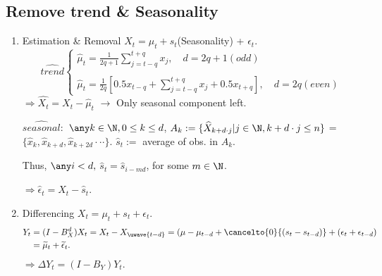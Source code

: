 \subsection{Remove trend \& Seasonality}
\begin{enumerate}
    \item Estimation \& Removal $X_t = \mu_t + s_t$(Seasonality) + $\epsilon_t$.
    \[
    \widehat{trend}
    \begin{cases}
    \widehat{\mu}_t = \frac{1}{2q+1}\sum_{j=t-q}^{t+q} x_j, \quad d = 2q+1 (odd)\\
    \\
    \widehat{\mu}_t = \frac{1}{2q}[0.5 x_{t-q} + \sum_{j=t-q}^{t+q} x_j + 0.5 x_{t+q}], \quad d = 2q (even)
    \end{cases}
    \]
    $\Rightarrow \widehat{X_t} = X_t - \widehat{\mu}_t$ $\rightarrow$ Only seasonal component left.
    
    $\widehat{seasonal}:$ $\any k\in\N, 0 \leq k \leq d$, $A_k := \{\widehat{X}_{k+d\cdot j} | j\in\N, k+d\cdot j \leq n\}$ = $\{\widehat{x}_{k}, \widehat{x}_{k+d}, \widehat{x}_{k+2d} \cdot\cdot\cdot\}$.
    $\widehat{s}_t :=$ average of obs. in $A_k$.
    
    Thus, $\any i<d,$ $\widehat{s}_t = \widehat{s}_{i-md}$, for some $m\in\N$.
    
    $\Rightarrow \widehat{\epsilon}_t = \widehat{X}_t - \widehat{s}_t$.
    
    \item Differencing $X_t = \mu_t +s_t + \epsilon_t$.
    \begin{align*}
    Y_t &= (I-B^d_X)X_t =X_t - X_{\uwave{t-d}} = (\mu - \mu_{t-d} + \cancelto{0}{(s_t - s_{t-d})} + (\epsilon_t + \epsilon_{t-d})\\
    &= \widetilde{\mu}_t + \widetilde{\epsilon}_t.
    \end{align*}
    $\Rightarrow \Delta Y_t = (I-B_Y)Y_t$.
    
\end{enumerate}
